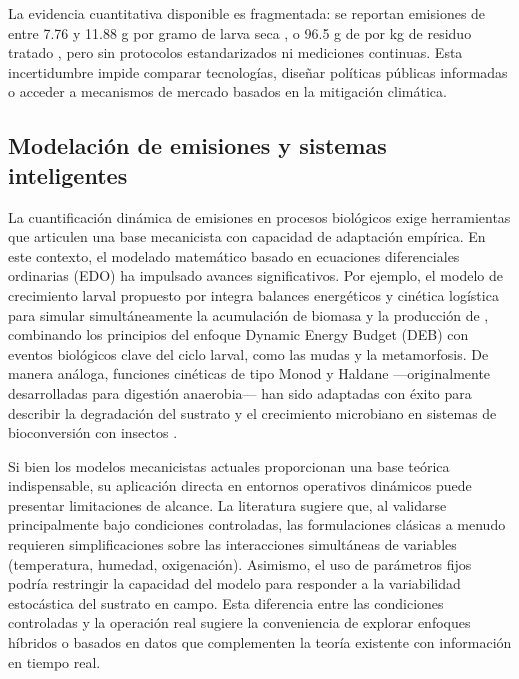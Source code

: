 La evidencia cuantitativa disponible es fragmentada: se reportan emisiones de  entre 7.76 y 11.88 g por gramo de larva seca \cite{rossiEstimatingDynamicsGreenhouse2024a}, o 96.5 g de  por kg de residuo tratado \cite{fuhrmannComprehensiveIndustryrelevantBlack2025a}, pero sin protocolos estandarizados ni mediciones continuas. Esta incertidumbre impide comparar tecnologías, diseñar políticas públicas informadas o acceder a mecanismos de mercado basados en la mitigación climática.

\subsection{Modelación de emisiones y sistemas inteligentes}

La cuantificación dinámica de emisiones en procesos biológicos exige herramientas que articulen una base mecanicista con capacidad de adaptación empírica. En este contexto, el modelado matemático basado en ecuaciones diferenciales ordinarias (EDO) ha impulsado avances significativos. Por ejemplo, el modelo de crecimiento larval propuesto por \citeauthor{eriksenDynamicModellingFeed2022} \cite{eriksenDynamicModellingFeed2022} integra balances energéticos y cinética logística para simular simultáneamente la acumulación de biomasa y la producción de , combinando los principios del enfoque Dynamic Energy Budget (DEB) con eventos biológicos clave del ciclo larval, como las mudas y la metamorfosis. De manera análoga, funciones cinéticas de tipo Monod y Haldane ---originalmente desarrolladas para digestión anaerobia--- han sido adaptadas con éxito para describir la degradación del sustrato y el crecimiento microbiano en sistemas de bioconversión con insectos \cite{ahlamineMathematicalAnalysisAnaerobic2024, winAnaerobicDigestionBlack2018a}.

Si bien los modelos mecanicistas actuales proporcionan una base teórica indispensable, su aplicación directa en entornos operativos dinámicos puede presentar limitaciones de alcance. La literatura \cite{bekkerImpactSubstrateMoisture2021a, rossiEstimatingDynamicsGreenhouse2024a} sugiere que, al validarse principalmente bajo condiciones controladas, las formulaciones clásicas a menudo requieren simplificaciones sobre las interacciones simultáneas de variables (temperatura, humedad, oxigenación). Asimismo, el uso de parámetros fijos podría restringir la capacidad del modelo para responder a la variabilidad estocástica del sustrato en campo. Esta diferencia entre las condiciones controladas y la operación real sugiere la conveniencia de explorar enfoques híbridos o basados en datos que complementen la teoría existente con información en tiempo real.

